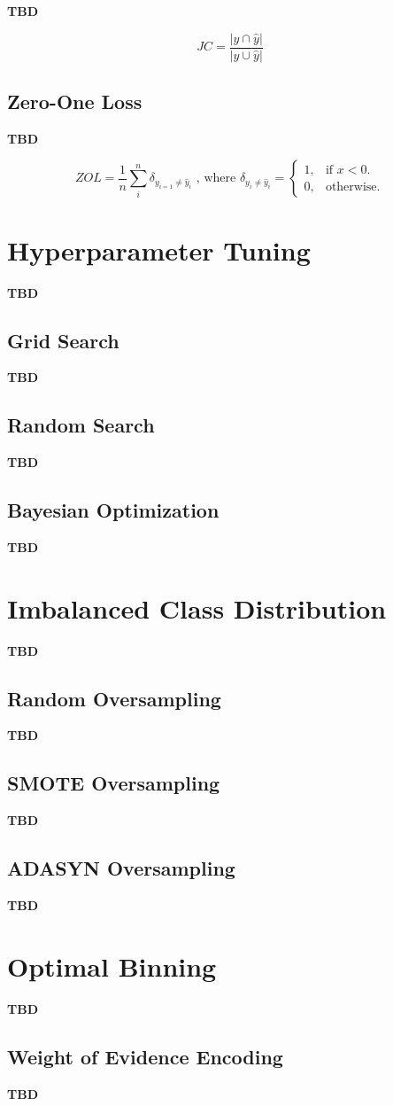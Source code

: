 \textbf{TBD}

\begin{equation}\label{eq}
    JC = \frac{|y \cap \hat{y} |}{|y \cup \hat{y} |}
    \end{equation}


\subsection{Zero-One Loss}

\textbf{TBD}

\begin{equation}\label{eq}
    ZOL = \frac{1}{n} \sum_{i}^{n} \delta_{y_{i=1} \neq \hat{y}_{i}} \text{ , where } \delta_{y_{i} \neq \hat{y}_{i}} = \begin{cases}
        1, & \text{if $x<0$}.\\
        0, & \text{otherwise}.
      \end{cases}
\end{equation}
\section{Hyperparameter Tuning}

\textbf{TBD}
\subsection{Grid Search}

\textbf{TBD}
\subsection{Random Search}

\textbf{TBD}
\subsection{Bayesian Optimization}

\textbf{TBD}
\section{Imbalanced Class Distribution}

\textbf{TBD}
\subsection{Random Oversampling}

\textbf{TBD}
\subsection{SMOTE Oversampling}

\textbf{TBD}
\subsection{ADASYN Oversampling}

\textbf{TBD}
\section{Optimal Binning}

\textbf{TBD}
\subsection{Weight of Evidence Encoding}

\textbf{TBD}